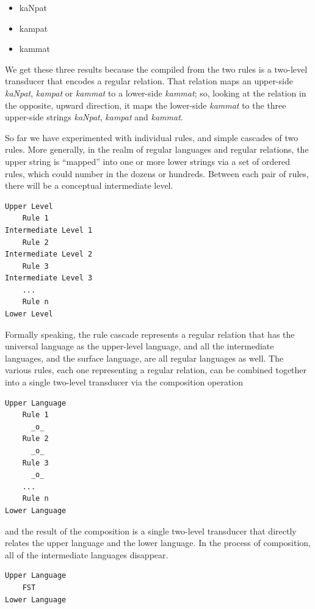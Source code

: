 \begin{itemize}
\item
kaNpat
\item
kampat
\item
kammat
\end{itemize}

\noindent
We get these three results because the \fst{} compiled from the two rules is a
two-level transducer that encodes a regular relation.  That relation maps an
upper-side \emph{kaNpat}, \emph{kampat} or \emph{kammat} to a lower-side
\emph{kammat}; so, looking at the relation in the opposite, upward direction, it maps the
lower-side \emph{kammat} to the three upper-side strings \emph{kaNpat}, \emph{kampat}
and \emph{kammat}.

So far we have experimented with individual rules, and simple cascades of two rules.
More generally, in the realm of regular languages and
regular relations, the upper string  is ``mapped'' into one or more 
lower strings via a set of ordered rules, which could number in the dozens or hundreds.  Between each
pair of rules, there will be a conceptual intermediate level.


\begin{Verbatim}
Upper Level
    Rule 1
Intermediate Level 1
    Rule 2
Intermediate Level 2
    Rule 3
Intermediate Level 3
    ...
    Rule n
Lower Level
\end{Verbatim}

\noindent
Formally speaking, the rule cascade represents a regular relation that
has the universal language as
the upper-level language, and all the intermediate languages, and the surface language, are all regular
languages as well.  The various rules, each one representing a regular relation, can be combined
together into a single two-level transducer via the composition operation

\begin{samepage}
\begin{Verbatim}
Upper Language
    Rule 1
      _o_
    Rule 2
      _o_
    Rule 3
      _o_
    ...
    Rule n
Lower Language
\end{Verbatim}
\end{samepage}

\noindent
and the result of the composition is a single two-level transducer that directly relates the upper
language and the lower language.  In the process of composition, all of the intermediate languages disappear.

\begin{Verbatim}
Upper Language
	FST
Lower Language
\end{Verbatim}



